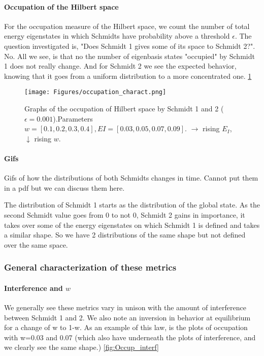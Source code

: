 \documentclass{article}
\begin{document}
\paragraph{Occupation of the Hilbert space}
For the occupation measure of the Hilbert space, we count the number of total energy eigenstates in which Schmidts have probability above a threshold $\epsilon$. {\color{teal}The question investigated is, "Does Schmidt 1 gives some of its space to Schmidt 2?". No}. All we see, is that no the number of eigenbasis states "occupied" by Schmidt 1 does not really change. And for Schmidt 2 we see the expected behavior, knowing that it goes from a uniform distribution to a more concentrated one. \ref{fig:characteriazation_occupation}

\begin{figure}[h]
    \centering
    \texttt{[image: Figures/occupation\_charact.png]}
    \caption{Graphs of the occupation of Hilbert space by Schmidt 1 and 2 ($\epsilon=0.001$).Parameters $w=[0.1,0.2,0.3,0.4], EI=[0.03,0.05,0.07,0.09]$. $\rightarrow$ rising $E_I$, $\downarrow$ rising $w$.}
    \label{fig:characteriazation_occupation}
\end{figure}

\paragraph{Gifs}
Gifs of how the distributions of both Schmidts changes in time. Cannot put them in a pdf but we can discuss them here.

The distribution of Schmidt 1 starts as the distribution of the global state. As the second Schmidt value goes from 0 to not 0, Schmidt 2 gains in importance, it takes over some of the energy eigenstates on which Schmidt 1 is defined and takes a similar shape. So we have 2 distributions of the same shape but not defined over the same space.

\subsubsection{General characterization of these metrics}

\paragraph{Interference and $w$}
We generally see these metrics vary in unison with the amount of interference between Schmidt 1 and 2. We also note an inversion in behavior at equilibrium for a change of w to 1-w. As an example of this law, is the plots of occupation with w=0.03 and 0.07 (which also have underneath the plots of interference, and we clearly see the same shape.) \ref{fig:Occup_interf}
\end{document}
